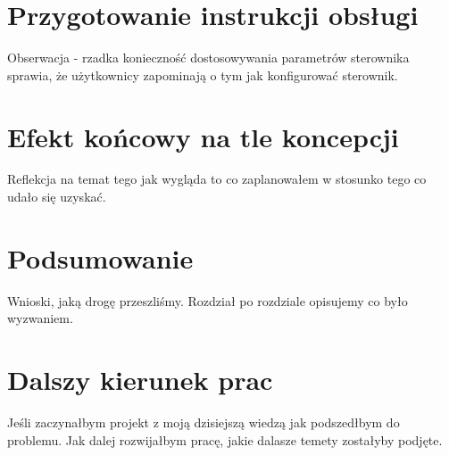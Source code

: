 \documentclass[12pt]{report}
\begin{document}
 \chapter{Przygotowanie instrukcji obsługi}
 Obserwacja - rzadka konieczność dostosowywania parametrów sterownika sprawia, że użytkownicy zapominają o tym jak konfigurować sterownik.
 
 
 \chapter{Efekt końcowy na tle koncepcji}
 Reflekcja na temat tego jak wygląda to co zaplanowałem w stosunko tego co udało się uzyskać.
 
 
 \chapter*{Podsumowanie}
 Wnioski, jaką drogę przeszliśmy. Rozdział po rozdziale opisujemy co było wyzwaniem.
 
 
 \chapter*{Dalszy kierunek prac}
 Jeśli zaczynałbym projekt z moją dzisiejszą wiedzą jak podszedłbym do problemu. Jak dalej rozwijałbym pracę, jakie dalasze temety zostałyby podjęte. 




 
  \nocite{*}
% 
% 
 
 
 \printbibliography[title={Książki},type=book]
 
 \printbibliography[title={Artykuły},type=article]
 
 \printbibliography[title={Prace dyplomowe}, type=thesis]
 
 \printbibliography[title={Materiały konferencyjne},type=inproceedings]
 
 \printbibliography[title={Pozostałe źródła}, nottype=article, nottype=book, nottype=inproceedings, nottype=thesis]

 

 
\end{document}
